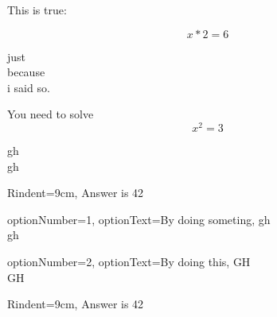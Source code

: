 \documentclass[12pt]{article}
\begin{document}
\begin{Theorem}{}

    This is true:

    \begin{tcbraster}[raster columns=3,raster halign=right]
        \centering
        \begin{tbox}[colorTheorem][0cm][2pt][10]
            {\large $$ x * 2 = 6 $$}
        \end{tbox}
    \end{tcbraster}


    \begin{TheoremProof}{}
        just\\
        because\\
        i said so.
    \end{TheoremProof}

\end{Theorem}



\newpage



\begin{Example}{}

    You need to solve $$ x^2 = 3 $$


    \begin{ExampleTask}{
    }
        gh\\
        gh
    \end{ExampleTask}


    \begin{ExampleAnswer}{
        Rindent=9cm,
    }
        Answer is 42
    \end{ExampleAnswer}
\end{Example}


\begin{Example}{}


    \begin{ExampleTask}{
        optionNumber=1,
        optionText=By doing someting,
    }
        gh\\
        gh
    \end{ExampleTask}


    \begin{ExampleTask}{
        optionNumber=2,
        optionText=By doing this,
    }
        GH\\
        GH
    \end{ExampleTask}


    \begin{ExampleAnswer}{
        Rindent=9cm,
    }
        Answer is 42
    \end{ExampleAnswer}
\end{Example}
\end{document}
